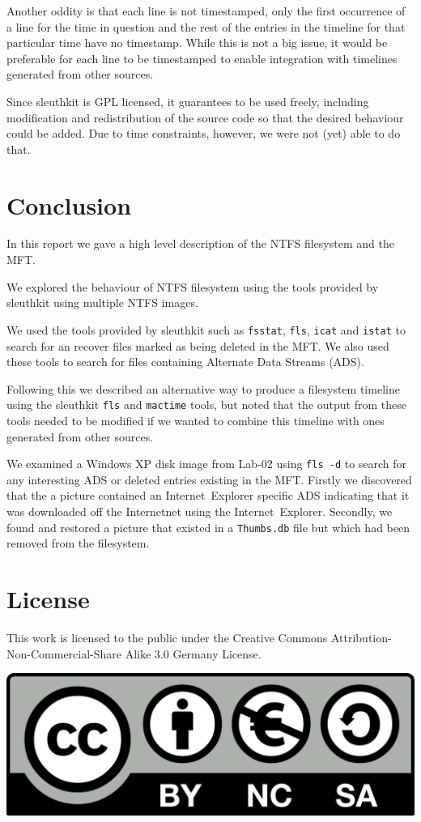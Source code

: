 \documentclass[a4paper,
    11pt,
    normalheadings,
    parindent,
    UKenglish,
    abstracton,
    ]{scrartcl}
\begin{document}
Another oddity is that each line is not timestamped, only the first occurrence of a line for the time in question and the rest of the entries in the timeline for that particular time have no timestamp.
While this is not a big issue, it would be preferable for each line to be timestamped to enable integration with timelines generated from other sources.

Since sleuthkit is GPL licensed, it guarantees to be used freely, including modification and redistribution of the source code so that the desired behaviour could be added.
Due to time constraints, however, we were not (yet) able to do that.



\section{Conclusion}

In this report we gave a high level description of the NTFS filesystem and the MFT.

We explored the behaviour of NTFS filesystem using the tools provided by sleuthkit using multiple NTFS images.

We used the tools provided by sleuthkit such as \texttt{fsstat}, \texttt{fls}, \texttt{icat} and \texttt{istat} to search for an recover files marked as being deleted in the MFT. We also used these tools to search for files containing Alternate Data Streams (ADS).

Following this we described an alternative way to produce a filesystem timeline using the sleuthkit \texttt{fls} and \texttt{mactime} tools, but noted that the output from these tools needed to be modified if we wanted to combine this timeline with ones generated from other sources.

We examined a Windows XP disk image from Lab-02 using \texttt{fls -d} to search for any interesting ADS or deleted entries existing in the MFT.
Firstly we discovered that the a picture contained an Internet~Explorer specific ADS indicating that it was downloaded off the Internetnet using the Internet~Explorer.
Secondly, we found and restored a picture that existed in a \texttt{Thumbs.db} file but which had been removed from the filesystem.


\section*{License}
This work is licensed to the public under the Creative Commons Attribution-Non-Commercial-Share Alike 3.0 Germany License.
\begin{center}\includegraphics{bin/by-nc-sa-eu.png}\end{center}
\end{document}
